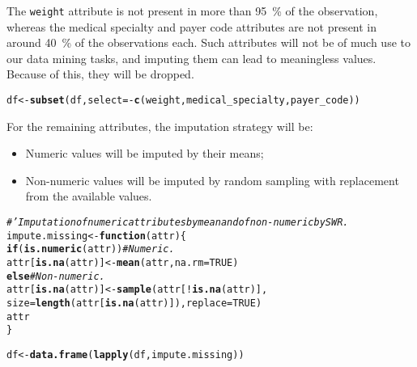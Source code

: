 \documentclass{article}\usepackage[]{graphicx}\usepackage[]{color}
\makeatletter
\newcommand{\hlnum}[1]{\textcolor[rgb]{0.686,0.059,0.569}{#1}}%
\newcommand{\hlcom}[1]{\textcolor[rgb]{0.678,0.584,0.686}{\textit{#1}}}%
\newcommand{\hlopt}[1]{\textcolor[rgb]{0,0,0}{#1}}%
\newcommand{\hlstd}[1]{\textcolor[rgb]{0.345,0.345,0.345}{#1}}%
\newcommand{\hlkwa}[1]{\textcolor[rgb]{0.161,0.373,0.58}{\textbf{#1}}}%
\newcommand{\hlkwb}[1]{\textcolor[rgb]{0.69,0.353,0.396}{#1}}%
\newcommand{\hlkwc}[1]{\textcolor[rgb]{0.333,0.667,0.333}{#1}}%
\newcommand{\hlkwd}[1]{\textcolor[rgb]{0.737,0.353,0.396}{\textbf{#1}}}%
\newenvironment{kframe}{%
 \def\at@end@of@kframe{}%
 \ifinner\ifhmode%
  \def\at@end@of@kframe{\end{minipage}}%
  \begin{minipage}{\columnwidth}%
 \fi\fi%
 \def\FrameCommand##1{\hskip\@totalleftmargin \hskip-\fboxsep
 \colorbox{shadecolor}{##1}\hskip-\fboxsep
     \hskip-\linewidth \hskip-\@totalleftmargin \hskip\columnwidth}%
 \MakeFramed {\advance\hsize-\width
   \@totalleftmargin\z@ \linewidth\hsize
   \@setminipage}}%
 {\par\unskip\endMakeFramed%
 \at@end@of@kframe}
\newenvironment{knitrout}{}{} %
\makeatother
\begin{document}
The \texttt{weight} attribute is not present in more than \SI{95}{\percent} of
the observation, whereas the medical specialty and payer code attributes are not
present in around \SI{40}{\percent} of the observations each.  Such attributes
will not be of much use to our data mining tasks, and imputing them can lead to
meaningless values.  Because of this, they will be dropped.

\begin{knitrout}
\color{fgcolor}\begin{kframe}
\begin{alltt}
\hlstd{df} \hlkwb{<-} \hlkwd{subset}\hlstd{(df,} \hlkwc{select}\hlstd{=}\hlopt{-}\hlkwd{c}\hlstd{(weight, medical_specialty, payer_code))}
\end{alltt}
\end{kframe}
\end{knitrout}

For the remaining attributes, the imputation strategy will be:
\begin{itemize}
\item Numeric values will be imputed by their means;
\item Non-numeric values will be imputed by random sampling with replacement
  from the available values.
\end{itemize}

\begin{knitrout}
\color{fgcolor}\begin{kframe}
\begin{alltt}
\hlcom{#' Imputation of numeric attributes by mean and of non-numeric by SWR.}
\hlstd{impute.missing} \hlkwb{<-} \hlkwa{function} \hlstd{(}\hlkwc{attr}\hlstd{) \{}
    \hlkwa{if} \hlstd{(}\hlkwd{is.numeric}\hlstd{(attr))}  \hlcom{# Numeric.}
        \hlstd{attr[}\hlkwd{is.na}\hlstd{(attr)]} \hlkwb{<-} \hlkwd{mean}\hlstd{(attr,} \hlkwc{na.rm}\hlstd{=}\hlnum{TRUE}\hlstd{)}
    \hlkwa{else}  \hlcom{# Non-numeric.}
        \hlstd{attr[}\hlkwd{is.na}\hlstd{(attr)]} \hlkwb{<-} \hlkwd{sample}\hlstd{(attr[}\hlopt{!}\hlkwd{is.na}\hlstd{(attr)],}
                                    \hlkwc{size}\hlstd{=}\hlkwd{length}\hlstd{(attr[}\hlkwd{is.na}\hlstd{(attr)]),} \hlkwc{replace}\hlstd{=}\hlnum{TRUE}\hlstd{)}
    \hlstd{attr}
\hlstd{\}}

\hlstd{df} \hlkwb{<-} \hlkwd{data.frame}\hlstd{(}\hlkwd{lapply}\hlstd{(df, impute.missing))}
\end{alltt}
\end{kframe}
\end{knitrout}
\end{document}
